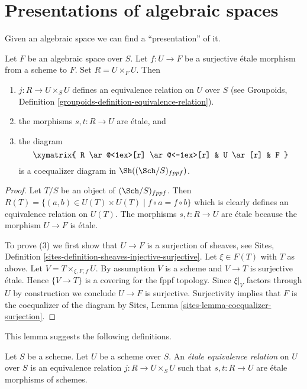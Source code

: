\section{Presentations of algebraic spaces}
\label{section-presentations}

\noindent
Given an algebraic space we can find a ``presentation'' of it.


\begin{lemma}
\label{lemma-space-presentation}
Let $F$ be an algebraic space over $S$. Let $f : U \to F$ be a
surjective \'etale morphism from a scheme to $F$. Set $R = U \times_F U$.
Then
\begin{enumerate}
\item $j : R \to U \times_S U$ defines an equivalence relation on
$U$ over $S$ (see
Groupoids, Definition \ref{groupoids-definition-equivalence-relation}).
\item the morphisms $s, t : R \to U$ are \'etale, and
\item the diagram
$$
\xymatrix{
R \ar@<1ex>[r] \ar@<-1ex>[r] &
U \ar[r] &
F
}
$$
is a coequalizer diagram in $\Sh((\Sch/S)_{fppf})$.
\end{enumerate}
\end{lemma}

\begin{proof}
Let $T/S$ be an object of $(\Sch/S)_{fppf}$.
Then $R(T) = \{(a, b) \in U(T) \times U(T) \mid f \circ a = f \circ b\}$
which is clearly defines an equivalence relation on $U(T)$.
The morphisms $s, t : R \to U$ are \'etale because the morphism
$U \to F$ is \'etale.

\medskip\noindent
To prove (3) we first show that
$U \to F$ is a surjection of sheaves, see
Sites, Definition \ref{sites-definition-sheaves-injective-surjective}.
Let $\xi \in F(T)$ with $T$ as above. Let $V = T \times_{\xi, F, f}U$.
By assumption $V$ is a scheme and $V \to T$ is surjective \'etale.
Hence $\{V \to T\}$ is a covering for the fppf topology.
Since $\xi|_V$ factors through $U$ by construction we
conclude $U \to F$ is surjective. Surjectivity implies that
$F$ is the coequalizer of the diagram by
Sites, Lemma \ref{sites-lemma-coequalizer-surjection}.
\end{proof}

\noindent
This lemma suggests the following definitions.

\begin{definition}
\label{definition-etale-equivalence-relation}
Let $S$ be a scheme. Let $U$ be a scheme over $S$.
An {\it \'etale equivalence relation} on $U$ over $S$
is an equivalence relation $j : R \to U \times_S U$
such that $s, t : R \to U$ are \'etale morphisms of schemes.
\end{definition}


